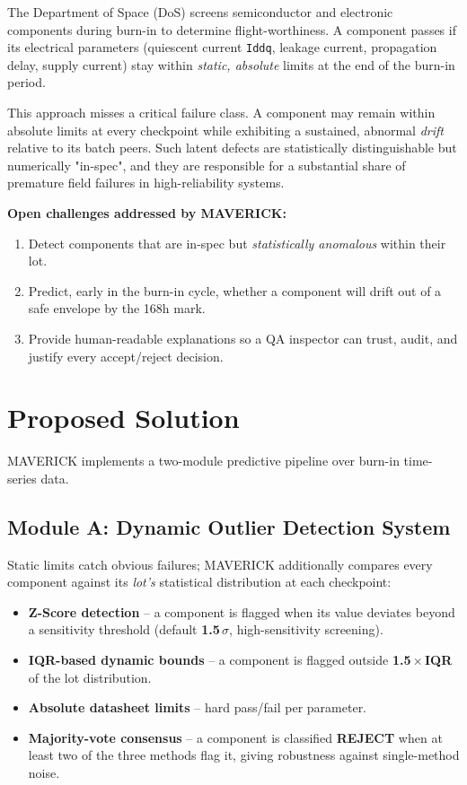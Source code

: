 \documentclass[11pt,a4paper]{article}
\begin{document}
The Department of Space (DoS) screens semiconductor and electronic components during burn-in to
determine flight-worthiness. A component passes if its electrical parameters (quiescent current
\texttt{Iddq}, leakage current, propagation delay, supply current) stay within \emph{static,
absolute} limits at the end of the burn-in period.

This approach misses a critical failure class. A component may remain within absolute limits at
every checkpoint while exhibiting a sustained, abnormal \emph{drift} relative to its batch
peers. Such latent defects are statistically distinguishable but numerically "in-spec", and they
are responsible for a substantial share of premature field failures in high-reliability systems.

\textbf{Open challenges addressed by MAVERICK:}
\begin{enumerate}[leftmargin=1.5em]
  \item Detect components that are in-spec but \emph{statistically anomalous} within their lot.
  \item Predict, early in the burn-in cycle, whether a component will drift out of a safe envelope
        by the 168h mark.
  \item Provide human-readable explanations so a QA inspector can trust, audit, and justify every
        accept/reject decision.
\end{enumerate}

\section{Proposed Solution}
\label{sec:solution}

MAVERICK implements a two-module predictive pipeline over burn-in time-series data.

\subsection{Module A: Dynamic Outlier Detection System}
\label{sec:modA}

Static limits catch obvious failures; MAVERICK additionally compares every component against its
\emph{lot's} statistical distribution at each checkpoint:

\begin{itemize}[leftmargin=1.5em]
  \item \textbf{Z-Score detection} -- a component is flagged when its value deviates beyond a
        sensitivity threshold (default \textbf{1.5\,$\sigma$}, high-sensitivity screening).
  \item \textbf{IQR-based dynamic bounds} -- a component is flagged outside
        \textbf{1.5\,$\times$\,IQR} of the lot distribution.
  \item \textbf{Absolute datasheet limits} -- hard pass/fail per parameter.
  \item \textbf{Majority-vote consensus} -- a component is classified \textbf{REJECT} when at
        least two of the three methods flag it, giving robustness against single-method noise.
\end{itemize}
\end{document}
